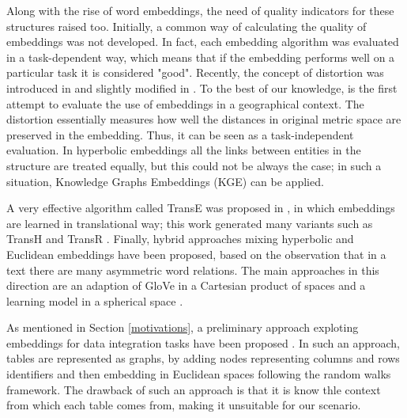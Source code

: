 Along with the rise of word embeddings, the need of quality indicators for these structures raised too. 
Initially, a common way of calculating the quality of embeddings was not developed. 
In fact, each embedding algorithm was evaluated in a task-dependent way, which means that if the embedding performs well on a particular task it is considered "good". 
Recently, the concept of distortion was introduced in \cite{sala2018representation} and slightly modified in \cite{dassereto2019evaluating}. 
To the best of our knowledge, \cite{dassereto2019evaluating} is the first attempt to evaluate the use of embeddings in a geographical context. 
The distortion essentially measures how well the distances in original metric space are preserved in the embedding. Thus, it can be seen as a task-independent evaluation. In hyperbolic embeddings all the links between entities in the structure are treated equally, but this could not be always the case; in such a situation, Knowledge Graphs Embeddings (KGE) can be applied. 

A very effective algorithm called TransE was proposed in \cite{bordes2013translating}, in which embeddings are learned in translational way; this work generated many variants such as TransH \cite{wang2014knowledge} and TransR \cite{lin2015learning}. 
Finally, hybrid approaches mixing hyperbolic and Euclidean embeddings have been proposed, based on the observation that in a text there are many asymmetric word relations. The main approaches in this direction are an adaption of GloVe in a Cartesian product of spaces \cite{tifrea2018poincare} and a learning model in a spherical space \cite{meng2019spherical}.  

As mentioned in Section \ref{motivations}, a preliminary approach exploting embeddings for data integration tasks have been proposed \cite{cappuzzo2020creating}. In such an approach, tables are represented as graphs, by adding nodes representing columns and rows identifiers and then embedding in Euclidean spaces following the random walks framework. The drawback of such an approach is that it is know thle context from which each table comes from, making it unsuitable for our scenario.


